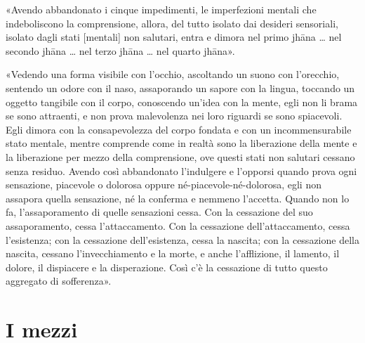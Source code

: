 
«Avendo abbandonato i cinque impedimenti, le imperfezioni mentali che
indeboliscono la comprensione, allora, del tutto isolato dai desideri
sensoriali, isolato dagli stati [mentali] non salutari, entra e dimora nel primo
jhāna … nel secondo jhāna … nel terzo jhāna … nel quarto jhāna».

«Vedendo una forma visibile con l’occhio, ascoltando un suono con l’orecchio,
sentendo un odore con il naso, assaporando un sapore con la lingua, toccando un
oggetto tangibile con il corpo, conoscendo un’idea con la mente, egli non li
brama se sono attraenti, e non prova malevolenza nei loro riguardi se sono
spiacevoli. Egli dimora con la consapevolezza del corpo fondata e con un
incommensurabile stato mentale, mentre comprende come in realtà sono la
liberazione della mente e la liberazione per mezzo della comprensione, ove
questi stati non salutari cessano senza residuo. Avendo così abbandonato
l’indulgere e l’opporsi quando prova ogni sensazione, piacevole o dolorosa
oppure né-piacevole-né-dolorosa, egli non assapora quella sensazione, né la
conferma e nemmeno l’accetta. Quando non lo fa, l’assaporamento di quelle
sensazioni cessa. Con la cessazione del suo assaporamento, cessa l’attaccamento.
Con la cessazione dell’attaccamento, cessa l’esistenza; con la cessazione
dell’esistenza, cessa la nascita; con la cessazione della nascita, cessano
l’invecchiamento e la morte, e anche l’afflizione, il lamento, il dolore, il
dispiacere e la disperazione. Così c’è la cessazione di tutto questo aggregato
di sofferenza».


\section*{I mezzi}

